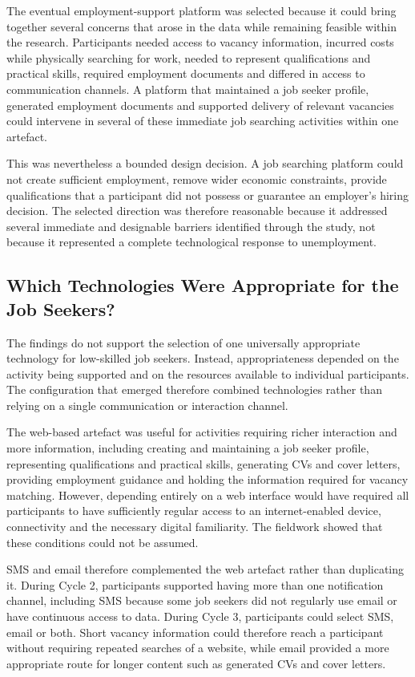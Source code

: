 The eventual employment-support platform was selected because it could bring together several concerns that arose in the data while remaining feasible within the research. Participants needed access to vacancy information, incurred costs while physically searching for work, needed to represent qualifications and practical skills, required employment documents and differed in access to communication channels. A platform that maintained a job seeker profile, generated employment documents and supported delivery of relevant vacancies could intervene in several of these immediate job searching activities within one artefact.

This was nevertheless a bounded design decision. A job searching platform could not create sufficient employment, remove wider economic constraints, provide qualifications that a participant did not possess or guarantee an employer's hiring decision. The selected direction was therefore reasonable because it addressed several immediate and designable barriers identified through the study, not because it represented a complete technological response to unemployment.


\subsection{Which Technologies Were Appropriate for the Job Seekers?}

The findings do not support the selection of one universally appropriate technology for low-skilled job seekers. Instead, appropriateness depended on the activity being supported and on the resources available to individual participants. The configuration that emerged therefore combined technologies rather than relying on a single communication or interaction channel.

The web-based artefact was useful for activities requiring richer interaction and more information, including creating and maintaining a job seeker profile, representing qualifications and practical skills, generating CVs and cover letters, providing employment guidance and holding the information required for vacancy matching. However, depending entirely on a web interface would have required all participants to have sufficiently regular access to an internet-enabled device, connectivity and the necessary digital familiarity. The fieldwork showed that these conditions could not be assumed.

SMS and email therefore complemented the web artefact rather than duplicating it. During Cycle 2, participants supported having more than one notification channel, including SMS because some job seekers did not regularly use email or have continuous access to data. During Cycle 3, participants could select SMS, email or both. Short vacancy information could therefore reach a participant without requiring repeated searches of a website, while email provided a more appropriate route for longer content such as generated CVs and cover letters.

